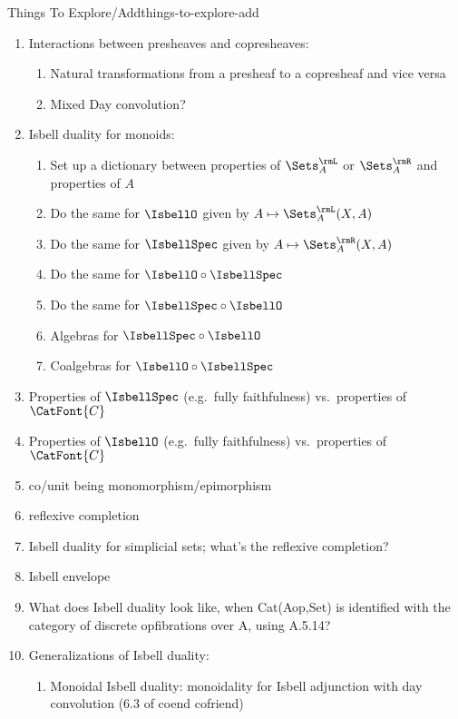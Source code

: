 \begin{remark}{Things To Explore/Add}{things-to-explore-add}
\begin{enumerate}
        \item Interactions between presheaves and copresheaves:
            \begin{enumerate}
                \item Natural transformations from a presheaf to a copresheaf and vice versa
                \item Mixed Day convolution?
            \end{enumerate}
        \item Isbell duality for monoids:
            \begin{enumerate}
                \item Set up a dictionary between properties of $\Sets^{\rmL}_{A}$ or $\Sets^{\rmR}_{A}$ and properties of $A$
                \item Do the same for $\IsbellO$ given by $A\mapsto\Sets^{\rmL}_{A}(X,A)$
                \item Do the same for $\IsbellSpec$ given by $A\mapsto\Sets^{\rmR}_{A}(X,A)$
                \item Do the same for $\IsbellO\circ\IsbellSpec$
                \item Do the same for $\IsbellSpec\circ\IsbellO$
                \item Algebras for $\IsbellSpec\circ\IsbellO$
                \item Coalgebras for $\IsbellO\circ\IsbellSpec$
            \end{enumerate}
        \item Properties of $\IsbellSpec$ (e.g.\ fully faithfulness) vs.\ properties of $\CatFont{C}$
        \item Properties of $\IsbellO$ (e.g.\ fully faithfulness) vs.\ properties of $\CatFont{C}$
        \item co/unit being monomorphism/epimorphism
        \item reflexive completion
        \item Isbell duality for simplicial sets; what's the reflexive completion?
        \item Isbell envelope
        \item What does Isbell duality look like, when Cat(Aop,Set) is identified with the category of discrete opfibrations over A, using A.5.14?
        \item Generalizations of Isbell duality:
            \begin{enumerate}
                \item Monoidal Isbell duality: monoidality for Isbell adjunction with day convolution (6.3 of coend cofriend)

\end{enumerate}
\end{enumerate}
\end{remark}

